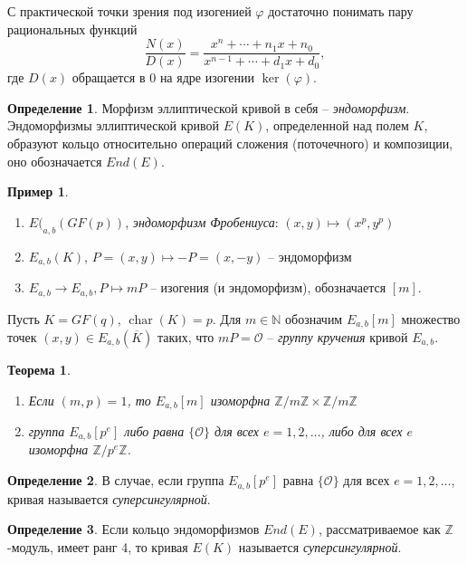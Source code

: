\documentclass[a4paper,12pt]{article}
\newcommand{\ZZ}{\mathbb{Z}}
\newcommand{\NN}{\mathbb{N}}
\DeclareMathOperator{\Char}{char}
\newtheorem{theorem}{Теорема}
\theoremstyle{definition}
\newtheorem{definition}{Определение}
\newtheorem{example}{Пример}
\begin{document}
С практической точки зрения под изогенией $\varphi$ достаточно понимать пару рациональных функций
$$
\frac{N(x)}{D(x)}=\frac{x^n+\cdots+n_1x+n_0}{x^{n-1}+\cdots+d_1x+d_0},
$$
где $D(x)$ обращается в $0$ на ядре изогении $\ker(\varphi)$.


\begin{definition}
Морфизм эллиптической кривой в себя -- \emph{эндоморфизм}.
Эндоморфизмы эллиптической кривой $E(K)$, определенной над полем $K$, образуют кольцо относительно операций сложения (поточечного) и композиции, оно обозначается $End(E)$. 
\end{definition}

\begin{example}
\begin{enumerate}

\item $E(_{a,b}(GF(p))$, \emph{эндоморфизм Фробениуса}: $(x,y)\mapsto (x^p,y^p)$

\item $E_{a,b}(K)$, $P=(x,y)\mapsto -P=(x,-y)$ -- эндоморфизм

\item $E_{a,b}\to E_{a,b}, P\mapsto mP$ -- изогения (и эндоморфизм), обозначается $[m]$.
\end{enumerate}
\end{example}

Пусть $K=GF(q)$, $\Char (K)=p$. Для $m\in\NN$ обозначим $E_{a,b}[m]$ множество точек $(x,y)\in E_{a,b}(\overline{K})$ таких, что $mP=\mathcal{O}$ -- \emph{группу кручения} кривой $E_{a,b}$. 

\begin{theorem}\label{thx}
 \begin{enumerate}
  \item Если $(m,p)=1$, то  $E_{a,b}[m]$ изоморфна $\ZZ/m\ZZ\times \ZZ/m\ZZ$
  \item группа $E_{a,b}[p^e] $ либо равна $\{\mathcal{O}\}$ для всех $e=1,2,\dots$, %
  либо для всех $e$  изоморфна $\ZZ/p^e\ZZ$.  
 \end{enumerate}
\end{theorem}

\begin{definition}
В случае, если группа $E_{a,b}[p^e] $  равна $\{\mathcal{O}\}$ для всех $e=1,2,\dots$, кривая называется \emph{суперсингулярной}.
\end{definition}

\begin{definition}
Если кольцо эндоморфизмов $End(E)$, рассматриваемое как $\ZZ$-модуль, имеет ранг 4, то кривая  $E(K)$ называется \emph{суперсингулярной}. 
\end{definition}
\end{document}
